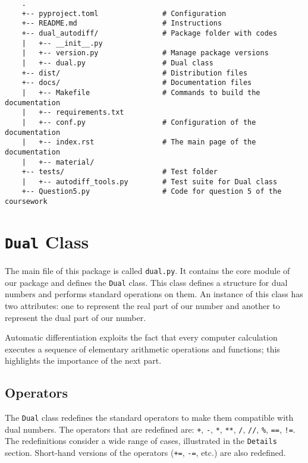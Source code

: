 \documentclass[a4paper,12pt]{article}
\begin{document}
\begin{verbatim}
    .
    +-- pyproject.toml               # Configuration 
    +-- README.md                    # Instructions
    +-- dual_autodiff/               # Package folder with codes
    |   +-- __init__.py
    |   +-- version.py               # Manage package versions
    |   +-- dual.py                  # Dual class
    +-- dist/                        # Distribution files
    +-- docs/                        # Documentation files
    |   +-- Makefile                 # Commands to build the documentation
    |   +-- requirements.txt              
    |   +-- conf.py                  # Configuration of the documentation
    |   +-- index.rst                # The main page of the documentation
    |   +-- material/                
    +-- tests/                       # Test folder
    |   +-- autodiff_tools.py        # Test suite for Dual class
    +-- Question5.py                 # Code for question 5 of the coursework
\end{verbatim}


\section{\texttt{Dual} Class}
The main file of this package is called \texttt{dual.py}. It contains the core module of our package and defines the \texttt{Dual} class. This class defines a structure for dual numbers and performs standard operations on them. An instance of this class has two attributes: one to represent the real part of our number and another to represent the dual part of our number.

Automatic differentiation exploits the fact that every computer calculation executes a sequence of elementary arithmetic operations and functions; this highlights the importance of the next part.

\subsection{Operators}
The \texttt{Dual} class redefines the standard operators to make them compatible with dual numbers. The operators that are redefined are: \texttt{+}, \texttt{-}, \texttt{*}, \texttt{**}, \texttt{/}, \texttt{//}, \texttt{\%}, \texttt{==}, \texttt{!=}. The redefinitions consider a wide range of cases, illustrated in the \texttt{Details} section.
Short-hand versions of the operators (\texttt{+=}, \texttt{-=}, etc.) are also redefined.
\end{document}
